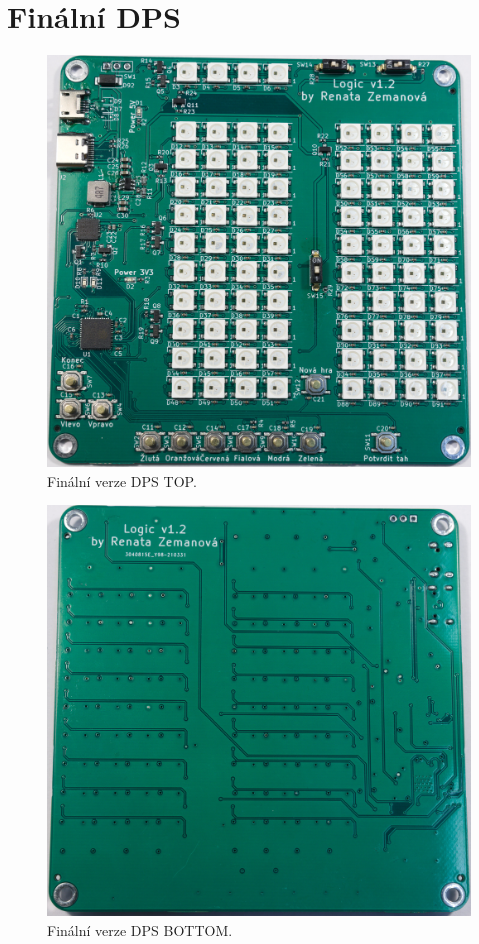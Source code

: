   \chapter{Finální DPS}
  \begin{figure}[!h]
    \begin{center}
      \includegraphics[scale=0.5]{prilohy/DPS_top.jpg}
    \end{center}
    \caption[Finální verze DPS TOP]{Finální verze DPS TOP.}
  \end{figure}

  \begin{figure}[!h]
    \begin{center}
      \includegraphics[scale=0.5]{prilohy/DPS_bottom.jpg}
    \end{center}
    \caption[Finální verze DPS BOTTOM]{Finální verze DPS BOTTOM.}
  \end{figure}

